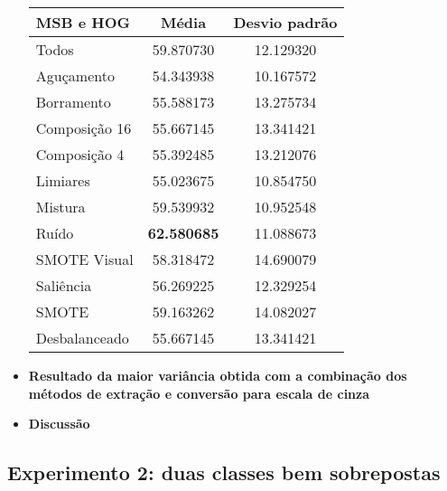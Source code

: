 \begin{itemize}
\begin{table}[]
\centering
\caption{}
\label{fig:resultados:1:tabpior}
\begin{tabular}{|l|c|c|}
\hline
\textbf{MSB e HOG} & \textbf{Média}     & \textbf{Desvio padrão} \\ \hline
Todos              & 59.870730          & 12.129320              \\ \hline
Aguçamento         & 54.343938          & 10.167572              \\ \hline
Borramento         & 55.588173          & 13.275734              \\ \hline
Composição 16      & 55.667145          & 13.341421              \\ \hline
Composição 4       & 55.392485          & 13.212076              \\ \hline
Limiares           & 55.023675          & 10.854750              \\ \hline
Mistura            & 59.539932          & 10.952548              \\ \hline
Ruído              & \textbf{62.580685} & 11.088673              \\ \hline
SMOTE Visual       & 58.318472          & 14.690079              \\ \hline
Saliência          & 56.269225          & 12.329254              \\ \hline
SMOTE              & 59.163262          & 14.082027              \\ \hline
Desbalanceado      & 55.667145          & 13.341421              \\ \hline
\end{tabular}
\end{table}

\item[] \textbf{Resultado da maior variância obtida com a combinação dos métodos de extração e conversão para escala de cinza}


\item[] \textbf{Discussão}

\end{itemize}


\subsection{Experimento 2: duas classes bem sobrepostas}

